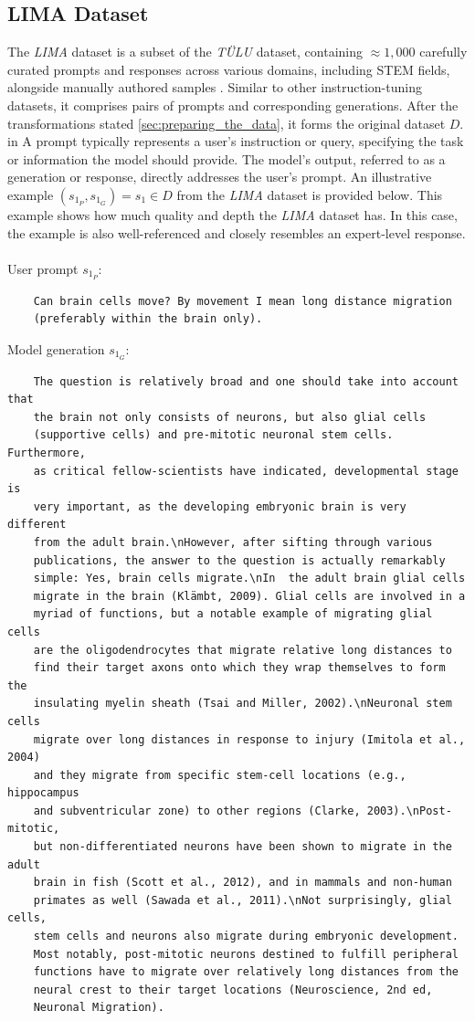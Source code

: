 \subsection{LIMA Dataset}\label{subsec:lima_dataset}
The \emph{LIMA} dataset is a subset of the \emph{TÜLU} dataset, containing $\approx1,000$ carefully curated prompts and responses across various domains, including STEM fields, alongside manually authored samples \cite{DBLP:conf/nips/ZhouLX0SMMEYYZG23}. Similar to other instruction-tuning datasets, it comprises pairs of prompts and corresponding generations. After the transformations stated \autoref{sec:preparing_the_data}, it forms the original dataset $D$. in A prompt typically represents a user's instruction or query, specifying the task or information the model should provide. The model's output, referred to as a generation or response, directly addresses the user's prompt. An illustrative example $(s_{1_P},s_{1_G})=s_1 \in D$ from the \emph{LIMA} dataset is provided below. This example shows how much quality and depth the \emph{LIMA} dataset has. In this case, the example is also well-referenced and closely resembles an expert-level response.
\\\\
User prompt $s_{1_P}$:
\begin{verbatim}
    Can brain cells move? By movement I mean long distance migration 
    (preferably within the brain only).
\end{verbatim}
Model generation $s_{1_G}$:
\begin{verbatim}
    The question is relatively broad and one should take into account that 
    the brain not only consists of neurons, but also glial cells 
    (supportive cells) and pre-mitotic neuronal stem cells. Furthermore,
    as critical fellow-scientists have indicated, developmental stage is
    very important, as the developing embryonic brain is very different 
    from the adult brain.\nHowever, after sifting through various 
    publications, the answer to the question is actually remarkably 
    simple: Yes, brain cells migrate.\nIn  the adult brain glial cells
    migrate in the brain (Klämbt, 2009). Glial cells are involved in a
    myriad of functions, but a notable example of migrating glial cells
    are the oligodendrocytes that migrate relative long distances to 
    find their target axons onto which they wrap themselves to form the
    insulating myelin sheath (Tsai and Miller, 2002).\nNeuronal stem cells
    migrate over long distances in response to injury (Imitola et al., 2004)
    and they migrate from specific stem-cell locations (e.g., hippocampus 
    and subventricular zone) to other regions (Clarke, 2003).\nPost-mitotic,
    but non-differentiated neurons have been shown to migrate in the adult 
    brain in fish (Scott et al., 2012), and in mammals and non-human 
    primates as well (Sawada et al., 2011).\nNot surprisingly, glial cells, 
    stem cells and neurons also migrate during embryonic development. 
    Most notably, post-mitotic neurons destined to fulfill peripheral 
    functions have to migrate over relatively long distances from the 
    neural crest to their target locations (Neuroscience, 2nd ed, 
    Neuronal Migration).
\end{verbatim}

